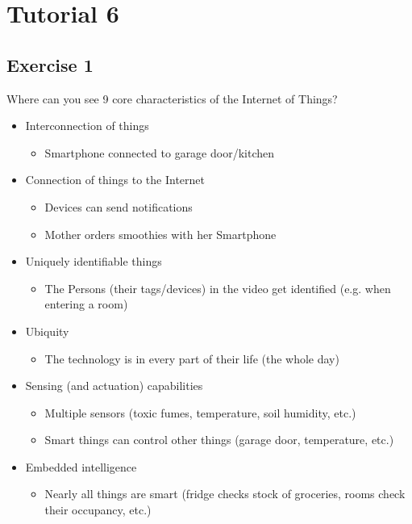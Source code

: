 \documentclass{article}
\begin{document}
\section{Tutorial 6}
\subsection{Exercise 1}
Where can you see 9 core characteristics of the Internet of Things?
\begin{itemize}
    \item Interconnection of things
          \begin{itemize}
              \item Smartphone connected to garage door/kitchen
          \end{itemize}
    \item Connection of things to the Internet
          \begin{itemize}
              \item Devices can send notifications
              \item Mother orders smoothies with her Smartphone
          \end{itemize}
    \item Uniquely identifiable things
          \begin{itemize}
              \item The Persons (their tags/devices) in the video get identified (e.g. when entering a room)
          \end{itemize}
    \item Ubiquity
          \begin{itemize}
              \item The technology is in every part of their life (the whole day)
          \end{itemize}
    \item Sensing (and actuation) capabilities
          \begin{itemize}
              \item Multiple sensors (toxic fumes, temperature, soil humidity, etc.)
              \item Smart things can control other things (garage door, temperature, etc.)
          \end{itemize}
    \item Embedded intelligence
          \begin{itemize}
              \item Nearly all things are smart (fridge checks stock of groceries, rooms check their occupancy, etc.)

\end{itemize}
\end{itemize}
\end{document}
